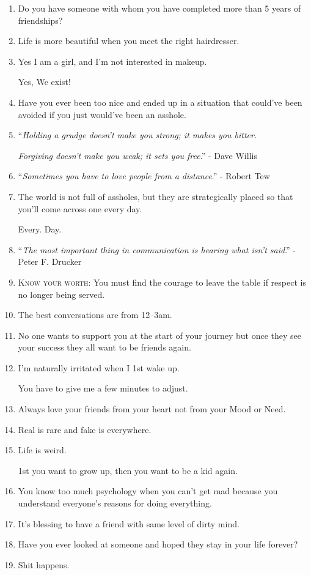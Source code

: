 \documentclass{article}
\numberwithin{equation}{section}
\begin{document}
\begin{enumerate}
    \textit{It's the little things that matter the most}.
    \item Do you have someone with whom you have completed more than 5 years of friendships?
    \item Life is more beautiful when you meet the right hairdresser.
    \item Yes I am a girl, and I'm not interested in makeup.
    
    Yes, We exist!
    \item Have you ever been too nice and ended up in a situation that could've been avoided if you just would've been an asshole.
    \item ``\textit{Holding a grudge doesn't make you strong; it makes you bitter.}
    
    \textit{Forgiving doesn't make you weak; it sets you free}.'' - Dave Willis
    \item ``\textit{Sometimes you have to love people from a distance}.'' - Robert Tew
    \item The world is not full of assholes, but they are strategically placed so that you'll come across one every day.
    
    Every. Day.
    \item ``\textit{The most important thing in communication is hearing what isn't said}.'' - Peter F. Drucker
    \item \textsc{Know your worth}: You must find the courage to leave the table if respect is no longer being served.
    \item The best conversations are from 12--3am.
    \item No one wants to support you at the start of your journey but once they see your success they all want to be friends again.
    \item I'm naturally irritated when I 1st wake up.
    
    You have to give me a few minutes to adjust.
    \item Always love your friends from your heart not from your Mood or Need.
    \item Real is rare and fake is everywhere.
    \item Life is weird.
    
    1st you want to grow up, then you want to be a kid again.
    \item You know too much psychology when you can't get mad because you understand everyone's reasons for doing everything.
    \item It's blessing to have a friend with same level of dirty mind.
    \item Have you ever looked at someone and hoped they stay in your life forever?
    \item Shit happens.
    

\end{enumerate}
\end{document}
